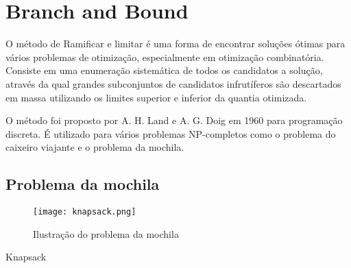\section{Branch and Bound} \label{sec:branch-and-bound}

O método de Ramificar e limitar é uma forma de 
encontrar soluções ótimas para vários problemas de otimização, especialmente em 
otimização combinatória. Consiste em uma enumeração sistemática de todos os candidatos
a solução, através da qual grandes subconjuntos de candidatos infrutíferos são 
descartados em massa utilizando os limites superior e inferior da quantia otimizada.

O método foi proposto por A. H. Land e A. G. Doig em 1960 para programação discreta.
É utilizado para vários problemas NP-completos como o problema do caixeiro viajante
e o problema da mochila. 

\subsection{Problema da mochila}

\begin{figure}[ht]
    \centering
    \texttt{[image: knapsack.png]}
    \caption{Ilustração do problema da mochila}
    \label{fig:knapsack}
\end{figure}

\begin{algorithm}
    \caption{Knapsack}
    \begin{algorithmic}[1]
    \EndIf
    \EndFor
    \EndProcedure
    \EndIf
    \EndFor
    \EndProcedure
    \end{algorithmic}
  \end{algorithm}

  \nocite{branch-and-bound}
  \nocite{knapsacker}

  \newpage